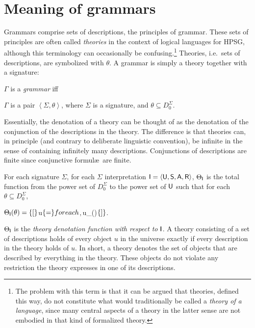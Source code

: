 \documentclass[output=paper
                ,modfonts
                ,nonflat
	        ,collection
	        ,collectionchapter
	        ,collectiontoclongg
 	        ,biblatex
                ,babelshorthands
                ,newtxmath
                ,draftmode
                ,colorlinks, citecolor=brown
]{./langsci/langscibook}
\begin{document}
{{\section{Meaning of grammars}
\label{sec-grammar-meaning}

Grammars comprise sets of descriptions, the principles of grammar. These sets of
principles are often called \emph{theories} in the context of
logical languages for HPSG, although this terminology can occasionally
be confusing.\footnote{The problem with this term is that
  it can be argued that theories, defined this way, do not constitute what would
  traditionally be called a \emph{theory of a language}, since many central
  aspects of a theory in the latter sense are not embodied in that kind
  of formalized theory.} Theories, i.e.\ sets of descriptions, are
symbolized with $\theta$.  A grammar is simply a theory together with a
signature:

\begin{mydef}\label{def-grammar}
  $\Gamma$ is a \emph{grammar} iff
  
$\Gamma$ is a pair
\( \left<\Sigma, \theta \right>\), where
$\Sigma$ is a signature, and
$\theta \subseteq D_0^{\Sigma}$.
\end{mydef}

Essentially, the denotation of a theory can be thought of as
the denotation of the conjunction of the descriptions in the theory.
The difference is
that theories can, in principle (and contrary to deliberate linguistic
convention), be infinite in the sense of containing infinitely many
descriptions. Conjunctions of descriptions are finite since conjunctive
formul\ae\ are finite.

\begin{mydef}
For each signature $\Sigma$,
for each $\Sigma$ interpretation $\mathsf{I}=\langle\mathsf{U},\mathsf{S},\mathsf{A},\mathsf{R}\rangle$,
$\Theta_{\mathsf{I}}$ is the total function from the power set of $D_0^{\Sigma}$ to the
power set of $\mathsf{U}$ such that
for each $\theta\subseteq D_0^{\Sigma}$,

$\Theta_{\Inte}(\theta)= %
\set[
$u\in \Unive$
\{{=}\} for each $\delta \in \theta$,
      $u\in\Dinte_{\Inte}(\delta)$
\{{]}\}$.
\end{mydef}

$\Theta_{\mathsf{I}}$ is the \emph{theory denotation function with respect
  to $\mathsf{I}$}. A theory consisting of a set of descriptions holds of
every object $u$ in the universe exactly if every description in the theory
holds of $u$. In short, a theory denotes the set of objects that are described
by everything in the theory. These objects do not violate any
restriction the theory
expresses in one of its descriptions.


}}
\end{document}
